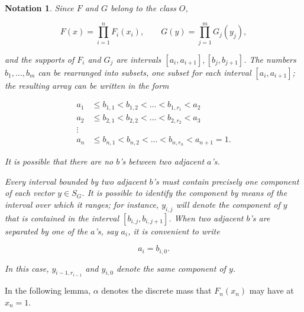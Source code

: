 \documentclass{article}
\newtheorem{notation}{Notation}
\begin{document}
\begin{notation}

Since $F$ and $G$ belong to the class $O$,

\[
F(x) = \prod_{i=1}^n F_i(x_i), \qquad G(y) = \prod_{j=1}^m G_j(y_j),
\]

and the supports of $F_i$ and $G_j$ are intervals $[a_i, a_{i+1}], [b_j,
b_{j+1}]$. The numbers $b_1, \dots, b_m$ can be rearranged into subsets, one
subset for each interval $[a_i, a_{i+1}]$; the resulting array can be written
in the form

\[
\begin{aligned}
a_1 &\leq b_{1,1} < b_{1, 2} < \dots < b_{1, r_1} < a_2 \\
a_2 &\leq b_{2,1} < b_{2, 2} < \dots < b_{2, r_2} < a_3 \\
\vdots & \\
a_n &\leq b_{n,1} < b_{n, 2} < \dots < b_{n, r_n} < a_{n+1} = 1.
\end{aligned}
\]

It is possible that there are no $b$'s between two adjacent $a$'s.

Every interval bounded by two adjacent $b$'s must contain precisely one
component of each vector $y \in S_G$. It is possible to identify the component
by means of the interval over which it ranges; for instance, $y_{i,j}$ will
denote the component of $y$ that is contained in the interval $[b_{i,j}, b_{i,
j+1}]$. When two adjacent $b$'s are separated by one of the $a$'s, say $a_i$,
it is convenient to write

\[
    a_i = b_{i, 0}.
\]

In this case, $y_{i-1, r_{i-1}}$ and $y_{i, 0}$ denote the same component of
$y$.

\end{notation}

In the following lemma, $\alpha$ denotes the discrete mass that $F_n(x_n)$ may
have at $x_n = 1$.
\end{document}
